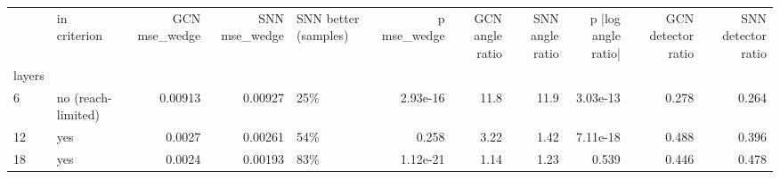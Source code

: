 \begin{tabular}{llrrlrrrrrr}
\toprule
 & in criterion & GCN mse\_wedge & SNN mse\_wedge & SNN better (samples) & p mse\_wedge & GCN angle ratio & SNN angle ratio & p |log angle ratio| & GCN detector ratio & SNN detector ratio \\
layers &  &  &  &  &  &  &  &  &  &  \\
\midrule
6 & no (reach-limited) & 0.00913 & 0.00927 & 25\% & 2.93e-16 & 11.8 & 11.9 & 3.03e-13 & 0.278 & 0.264 \\
12 & yes & 0.0027 & 0.00261 & 54\% & 0.258 & 3.22 & 1.42 & 7.11e-18 & 0.488 & 0.396 \\
18 & yes & 0.0024 & 0.00193 & 83\% & 1.12e-21 & 1.14 & 1.23 & 0.539 & 0.446 & 0.478 \\
\bottomrule
\end{tabular}
